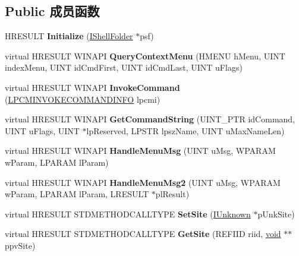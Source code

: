 \subsection*{Public 成员函数}
\begin{DoxyCompactItemize}
\item 
\mbox{\label{class_c_def_view_bckgrnd_menu_a55d63f50e6a32cdcc0c5b97938b4164f}} 
H\+R\+E\+S\+U\+LT {\bfseries Initialize} (\hyperlink{interface_i_shell_folder}{I\+Shell\+Folder} $\ast$psf)
\item 
\mbox{\label{class_c_def_view_bckgrnd_menu_a8ee5b2f2bace3449d1315abf920e7259}} 
virtual H\+R\+E\+S\+U\+LT W\+I\+N\+A\+PI {\bfseries Query\+Context\+Menu} (H\+M\+E\+NU h\+Menu, U\+I\+NT index\+Menu, U\+I\+NT id\+Cmd\+First, U\+I\+NT id\+Cmd\+Last, U\+I\+NT u\+Flags)
\item 
\mbox{\label{class_c_def_view_bckgrnd_menu_abed0542a4c464243d611f85d1e2b22c1}} 
virtual H\+R\+E\+S\+U\+LT W\+I\+N\+A\+PI {\bfseries Invoke\+Command} (\hyperlink{struct_i_context_menu_1_1tag_c_m_i_n_v_o_k_e_c_o_m_m_a_n_d_i_n_f_o}{L\+P\+C\+M\+I\+N\+V\+O\+K\+E\+C\+O\+M\+M\+A\+N\+D\+I\+N\+FO} lpcmi)
\item 
\mbox{\label{class_c_def_view_bckgrnd_menu_a101368901320ab1faefd6f14a85e7fac}} 
virtual H\+R\+E\+S\+U\+LT W\+I\+N\+A\+PI {\bfseries Get\+Command\+String} (U\+I\+N\+T\+\_\+\+P\+TR id\+Command, U\+I\+NT u\+Flags, U\+I\+NT $\ast$lp\+Reserved, L\+P\+S\+TR lpsz\+Name, U\+I\+NT u\+Max\+Name\+Len)
\item 
\mbox{\label{class_c_def_view_bckgrnd_menu_a73b3d7f4af176516d0748549c908776c}} 
virtual H\+R\+E\+S\+U\+LT W\+I\+N\+A\+PI {\bfseries Handle\+Menu\+Msg} (U\+I\+NT u\+Msg, W\+P\+A\+R\+AM w\+Param, L\+P\+A\+R\+AM l\+Param)
\item 
\mbox{\label{class_c_def_view_bckgrnd_menu_a80bfc0445eced6396e2f23da1f729a0f}} 
virtual H\+R\+E\+S\+U\+LT W\+I\+N\+A\+PI {\bfseries Handle\+Menu\+Msg2} (U\+I\+NT u\+Msg, W\+P\+A\+R\+AM w\+Param, L\+P\+A\+R\+AM l\+Param, L\+R\+E\+S\+U\+LT $\ast$pl\+Result)
\item 
\mbox{\label{class_c_def_view_bckgrnd_menu_a4e7fa5c1ec22bc0da025544247b25a87}} 
virtual H\+R\+E\+S\+U\+LT S\+T\+D\+M\+E\+T\+H\+O\+D\+C\+A\+L\+L\+T\+Y\+PE {\bfseries Set\+Site} (\hyperlink{interface_i_unknown}{I\+Unknown} $\ast$p\+Unk\+Site)
\item 
\mbox{\label{class_c_def_view_bckgrnd_menu_ac2ea573b099d35195eac96f19e63e18d}} 
virtual H\+R\+E\+S\+U\+LT S\+T\+D\+M\+E\+T\+H\+O\+D\+C\+A\+L\+L\+T\+Y\+PE {\bfseries Get\+Site} (R\+E\+F\+I\+ID riid, \hyperlink{interfacevoid}{void} $\ast$$\ast$ppv\+Site)
\end{DoxyCompactItemize}
